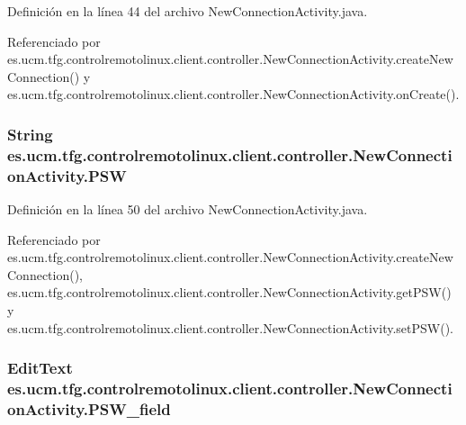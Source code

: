 Definición en la línea 44 del archivo New\-Connection\-Activity.\-java.



Referenciado por es.\-ucm.\-tfg.\-controlremotolinux.\-client.\-controller.\-New\-Connection\-Activity.\-create\-New\-Connection() y es.\-ucm.\-tfg.\-controlremotolinux.\-client.\-controller.\-New\-Connection\-Activity.\-on\-Create().

\hypertarget{classes_1_1ucm_1_1tfg_1_1controlremotolinux_1_1client_1_1controller_1_1NewConnectionActivity_aa82f9264c686d25759da2e6531a95603}{
\subsubsection[{P\-S\-W}]{\setlength{\rightskip}{0pt plus 5cm}String es.\-ucm.\-tfg.\-controlremotolinux.\-client.\-controller.\-New\-Connection\-Activity.\-P\-S\-W\hspace{0.3cm}{\ttfamily [private]}}}\label{classes_1_1ucm_1_1tfg_1_1controlremotolinux_1_1client_1_1controller_1_1NewConnectionActivity_aa82f9264c686d25759da2e6531a95603}


Definición en la línea 50 del archivo New\-Connection\-Activity.\-java.



Referenciado por es.\-ucm.\-tfg.\-controlremotolinux.\-client.\-controller.\-New\-Connection\-Activity.\-create\-New\-Connection(), es.\-ucm.\-tfg.\-controlremotolinux.\-client.\-controller.\-New\-Connection\-Activity.\-get\-P\-S\-W() y es.\-ucm.\-tfg.\-controlremotolinux.\-client.\-controller.\-New\-Connection\-Activity.\-set\-P\-S\-W().

\hypertarget{classes_1_1ucm_1_1tfg_1_1controlremotolinux_1_1client_1_1controller_1_1NewConnectionActivity_a243da6d30e610fd51b6b878dce2acc7c}{
\subsubsection[{P\-S\-W\-\_\-field}]{\setlength{\rightskip}{0pt plus 5cm}Edit\-Text es.\-ucm.\-tfg.\-controlremotolinux.\-client.\-controller.\-New\-Connection\-Activity.\-P\-S\-W\-\_\-field\hspace{0.3cm}{\ttfamily [private]}}}\label{classes_1_1ucm_1_1tfg_1_1controlremotolinux_1_1client_1_1controller_1_1NewConnectionActivity_a243da6d30e610fd51b6b878dce2acc7c}


